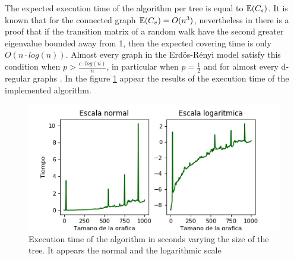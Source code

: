 The expected execution time of the algorithm per tree is equal to $\mathbb{E}(C_{s})$. It is known that for the connected graph $\mathbb{E}(C_{v}) = O(n^{3})$, nevertheless in \cite[Broder, Andrei 89]{boundsoncovertime} there is a proof that if the transition matrix of a random walk have the second greater eigenvalue bounded away from 1, then the expected covering time is only $O(n\cdot log(n))$. Almost every graph in the Erdös-Rényi model satisfy this condition when $p > \frac{c\cdot log(n)}{n}$, in particular when $p=\frac{1}{2}$ and for almost every d-regular graphs \cite[Friedman 89]{secondEigenValue}. 
In the figure \ref{fig:tiemposGEN} appear the results of the execution time of the implemented algorithm.
\begin{figure}[h!]
	\centering
	\includegraphics[scale=0.8]{Python/Figures/Time-generate.png}
	\caption{ Execution time of the algorithm in seconds varying the size of the tree. It appears the normal and the logarithmic scale}
	\label{fig:tiemposGEN}
\end{figure}
